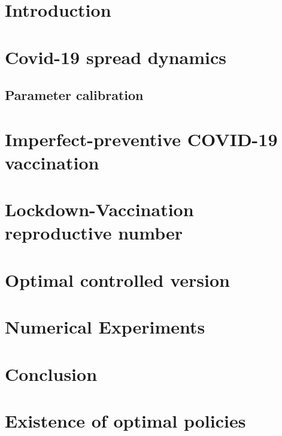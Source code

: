 \documentclass[3p, sort&compress]{elsarticle}
\begin{document}
    
    \section{Introduction}
        
    \section{Covid-19 spread dynamics}
        \label{sec:Covid19_spread}
        
        \subsection{Parameter calibration}
            
    \section{Imperfect-preventive COVID-19 vaccination}
        \label{sec:vaccination_model}
        
    \section{Lockdown-Vaccination reproductive number}
        \label{sec:reproductive_number}
        
    \section{Optimal controlled version}
        \label{sec:optimal_controlled}
        
    \section{Numerical Experiments}
        \label{sec:numerical_experiments}
        
        
    \section{Conclusion}
    \label{sec:conclusion}
    \listofchanges[style=compactsummary]
    \appendix
    \section{Existence of optimal policies}
        
        
    
\end{document}
